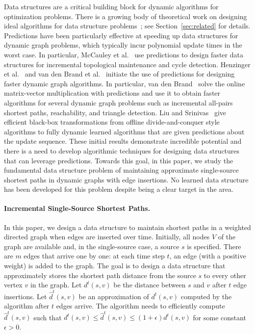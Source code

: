 \documentclass[11pt]{article}
\begin{document}
Data structures are a critical building block for dynamic algorithms for optimization problems.   
There is a growing body of theoretical work on designing ideal algorithms for data structure problems~\cite{LinLW22,
McCauleyMNS23,
McCauleyMoNi24,
BrandFNP24, liu2023predicted, 
benomar2024learningaugmented, 
zeynali2024robust, bai2023sorting,
dinitz2024binary}; see Section~\ref{sec:related} for details. 
Predictions have been particularly effective at speeding up 
data structures for dynamic graph problems, which typically incur polynomial update times in the worst case.  
In particular, McCauley et al.~\cite{McCauleyMoNi24} use
predictions to design faster data structures for incremental topological maintenance and cycle detection.  
Henzinger et al.~\cite{HenzingerSSY24} and van den Brand et al.~\cite{BrandFNP24} initiate the use of predictions for designing faster dynamic graph algorithms.
In particular, van den Brand~\cite{BrandFNP24} solve the online matrix-vector multiplication with predictions and use it to obtain faster algorithms for several dynamic graph problems such as incremental all-pairs shortest paths, reachability, and triangle detection. Liu and Srinivas~\cite{liu2023predicted} give efficient black-box transformations from  offline divide-and-conquer style algorithms to fully
dynamic learned algorithms that are given predictions about the update sequence.  
These initial results demonstrate incredible potential and there is a need to develop algorithmic techniques for designing data structures that can leverage predictions.  
Towards this goal, in this paper, we study the fundamental data structure problem of maintaining approximate single-source shortest paths in dynamic graphs with edge insertions. No learned data structure has been developed for this problem despite being a clear target in the area. 

\paragraph{Incremental Single-Source Shortest Paths.}  In this paper, we design a data structure to maintain shortest paths in a weighted directed graph when edges are inserted over time. 
Initially, all nodes $V$ of the graph are available and, in the single-source case, a source $s$ is specified. There are $m$ edges that arrive one by one:  at each time step $t$, an edge (with a positive weight) is added to the graph.   The goal is to design a data structure that approximately stores the shortest path distance from the source $s$ to every other vertex $v$ in the graph.   
Let $d^t(s,v)$ be the distance between $s$ and $v$ after $t$ edge insertions.  Let $\hat{d}^t(s,v)$ be an approximation of $d^t(s,v)$  computed by the algorithm after $t$ edges arrive. The algorithm needs to efficiently compute $\hat{d}^t(s,v)$ such that $d^t(s,v) \leq \hat{d}^t(s,v) \leq (1 + \epsilon) d^t(s,v)$ for some constant $\epsilon  > 0$.  
\end{document}
